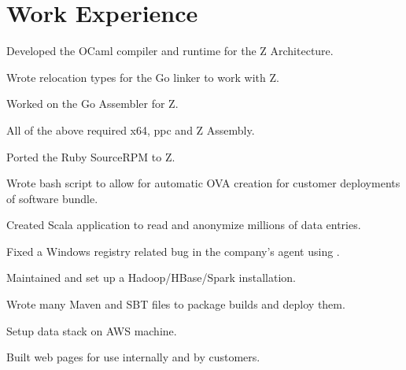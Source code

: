 \documentclass[letterpaper]{deedy-resume-modified} %
\begin{document}
\hfill
%
%
\begin{minipage}[t]{0.66\textwidth} %


\section{Work Experience}


\vspace{\topsep}
\begin{tightitemize}
\item Developed the OCaml compiler and runtime for the Z Architecture.
\item Wrote relocation types for the Go linker to work with Z.
\item Worked on the Go Assembler for Z.
\item All of the above required x64, ppc and Z Assembly.
\item Ported the Ruby SourceRPM to Z.
\end{tightitemize}

\sectionspace %



\begin{tightitemize}
\item Wrote bash script to allow for automatic OVA creation for customer deployments of software bundle.
\item Created Scala application to read and anonymize millions of data entries.
\item Fixed a Windows registry related bug in the company's agent using \CPP.
\item Maintained and set up a Hadoop/HBase/Spark installation.
\item Wrote many Maven and SBT files to package builds and deploy them.
\item Setup data stack on AWS machine.
\item Built web pages for use internally and by customers.
\end{tightitemize}


\end{minipage}
\end{document}
